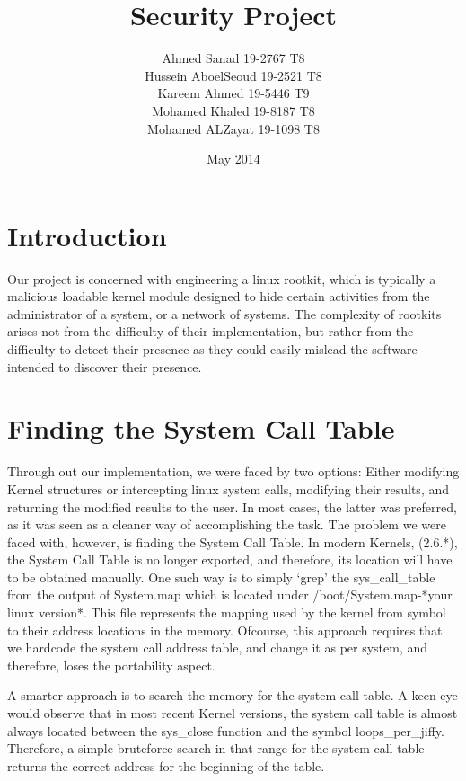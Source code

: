 \documentclass{article}
\title{Security Project}
\author{Ahmed Sanad 19-2767 T8\\ Hussein AboelSeoud 19-2521 T8\\ Kareem Ahmed 19-5446 T9\\ Mohamed Khaled 19-8187 T8\\ Mohamed ALZayat 19-1098 T8\\}
\date{May 2014}
\begin{document}
\maketitle

\clearpage

\tableofcontents
\clearpage

\section{Introduction}
    Our project is concerned with engineering a linux rootkit, which is typically a malicious loadable kernel module designed to hide certain activities from the administrator of a system, or a network of systems. The complexity of rootkits arises not from the difficulty of their implementation, but rather from the difficulty to detect their presence as they could easily mislead the software intended to discover their presence.

\section{Finding the System Call Table}
    
    Through out our implementation, we were faced by two options: Either modifying Kernel structures or intercepting linux system calls, modifying their results, and returning the modified results to the user. In most cases, the latter was preferred, as it was seen as a cleaner way of accomplishing the task. The problem we were faced with, however, is finding the System Call Table. In modern Kernels, (2.6.*), the System Call Table is no longer exported, and therefore, its location will have to be obtained manually. One such way is to simply `grep' the sys\_call\_table from the output of System.map which is located under /boot/System.map-*your linux version*. This file represents the mapping used by the kernel from symbol to their address locations in the memory. Ofcourse, this approach requires that we hardcode the system call address table, and change it as per system, and therefore, loses the portability aspect.
    
    A smarter approach is to search the memory for the system call table. A keen eye would observe that in most recent Kernel versions, the system call table is almost always located between the sys\_close function and the symbol loops\_per\_jiffy. Therefore, a simple bruteforce search in that range for the system call table returns the correct address for the beginning of the table.
    
\end{document}
